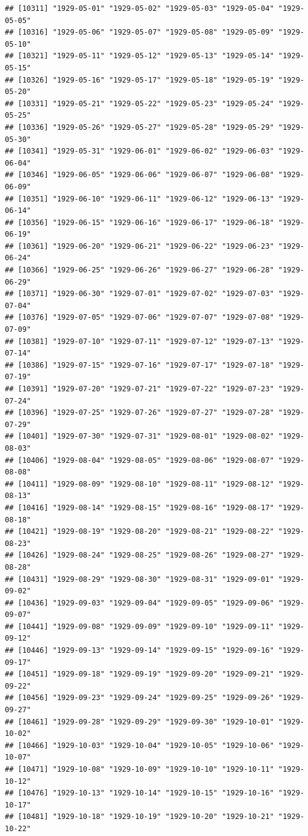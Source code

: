 \documentclass{article}\usepackage[]{graphicx}\usepackage[]{color}
\makeatletter
\newenvironment{kframe}{%
 \def\at@end@of@kframe{}%
 \ifinner\ifhmode%
  \def\at@end@of@kframe{\end{minipage}}%
  \begin{minipage}{\columnwidth}%
 \fi\fi%
 \def\FrameCommand##1{\hskip\@totalleftmargin \hskip-\fboxsep
 \colorbox{shadecolor}{##1}\hskip-\fboxsep
     \hskip-\linewidth \hskip-\@totalleftmargin \hskip\columnwidth}%
 \MakeFramed {\advance\hsize-\width
   \@totalleftmargin\z@ \linewidth\hsize
   \@setminipage}}%
 {\par\unskip\endMakeFramed%
 \at@end@of@kframe}
\newenvironment{knitrout}{}{} %
\makeatother
\begin{document}
\begin{description}
\begin{knitrout}
\begin{kframe}
\begin{verbatim}
## [10311] "1929-05-01" "1929-05-02" "1929-05-03" "1929-05-04" "1929-05-05"
## [10316] "1929-05-06" "1929-05-07" "1929-05-08" "1929-05-09" "1929-05-10"
## [10321] "1929-05-11" "1929-05-12" "1929-05-13" "1929-05-14" "1929-05-15"
## [10326] "1929-05-16" "1929-05-17" "1929-05-18" "1929-05-19" "1929-05-20"
## [10331] "1929-05-21" "1929-05-22" "1929-05-23" "1929-05-24" "1929-05-25"
## [10336] "1929-05-26" "1929-05-27" "1929-05-28" "1929-05-29" "1929-05-30"
## [10341] "1929-05-31" "1929-06-01" "1929-06-02" "1929-06-03" "1929-06-04"
## [10346] "1929-06-05" "1929-06-06" "1929-06-07" "1929-06-08" "1929-06-09"
## [10351] "1929-06-10" "1929-06-11" "1929-06-12" "1929-06-13" "1929-06-14"
## [10356] "1929-06-15" "1929-06-16" "1929-06-17" "1929-06-18" "1929-06-19"
## [10361] "1929-06-20" "1929-06-21" "1929-06-22" "1929-06-23" "1929-06-24"
## [10366] "1929-06-25" "1929-06-26" "1929-06-27" "1929-06-28" "1929-06-29"
## [10371] "1929-06-30" "1929-07-01" "1929-07-02" "1929-07-03" "1929-07-04"
## [10376] "1929-07-05" "1929-07-06" "1929-07-07" "1929-07-08" "1929-07-09"
## [10381] "1929-07-10" "1929-07-11" "1929-07-12" "1929-07-13" "1929-07-14"
## [10386] "1929-07-15" "1929-07-16" "1929-07-17" "1929-07-18" "1929-07-19"
## [10391] "1929-07-20" "1929-07-21" "1929-07-22" "1929-07-23" "1929-07-24"
## [10396] "1929-07-25" "1929-07-26" "1929-07-27" "1929-07-28" "1929-07-29"
## [10401] "1929-07-30" "1929-07-31" "1929-08-01" "1929-08-02" "1929-08-03"
## [10406] "1929-08-04" "1929-08-05" "1929-08-06" "1929-08-07" "1929-08-08"
## [10411] "1929-08-09" "1929-08-10" "1929-08-11" "1929-08-12" "1929-08-13"
## [10416] "1929-08-14" "1929-08-15" "1929-08-16" "1929-08-17" "1929-08-18"
## [10421] "1929-08-19" "1929-08-20" "1929-08-21" "1929-08-22" "1929-08-23"
## [10426] "1929-08-24" "1929-08-25" "1929-08-26" "1929-08-27" "1929-08-28"
## [10431] "1929-08-29" "1929-08-30" "1929-08-31" "1929-09-01" "1929-09-02"
## [10436] "1929-09-03" "1929-09-04" "1929-09-05" "1929-09-06" "1929-09-07"
## [10441] "1929-09-08" "1929-09-09" "1929-09-10" "1929-09-11" "1929-09-12"
## [10446] "1929-09-13" "1929-09-14" "1929-09-15" "1929-09-16" "1929-09-17"
## [10451] "1929-09-18" "1929-09-19" "1929-09-20" "1929-09-21" "1929-09-22"
## [10456] "1929-09-23" "1929-09-24" "1929-09-25" "1929-09-26" "1929-09-27"
## [10461] "1929-09-28" "1929-09-29" "1929-09-30" "1929-10-01" "1929-10-02"
## [10466] "1929-10-03" "1929-10-04" "1929-10-05" "1929-10-06" "1929-10-07"
## [10471] "1929-10-08" "1929-10-09" "1929-10-10" "1929-10-11" "1929-10-12"
## [10476] "1929-10-13" "1929-10-14" "1929-10-15" "1929-10-16" "1929-10-17"
## [10481] "1929-10-18" "1929-10-19" "1929-10-20" "1929-10-21" "1929-10-22"

\end{verbatim}
\end{kframe}
\end{knitrout}
\end{description}
\end{document}
